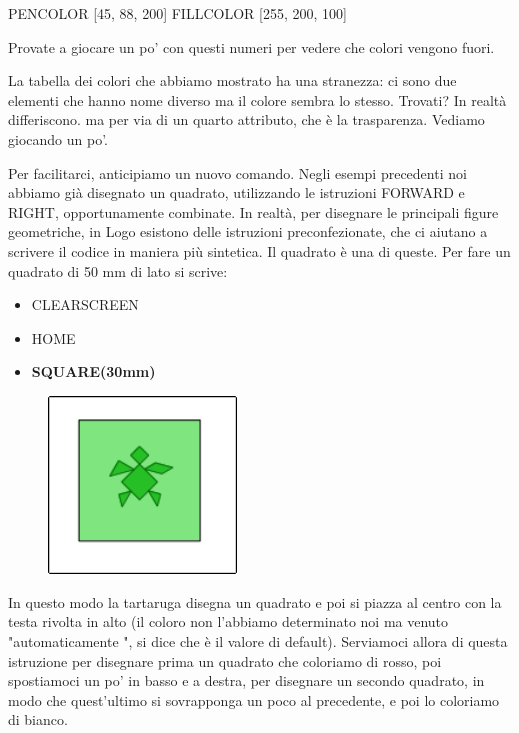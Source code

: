 PENCOLOR [45, 88, 200]
FILLCOLOR [255, 200, 100]

Provate a giocare un po' con questi numeri per vedere che colori vengono fuori.

La tabella dei colori che abbiamo mostrato ha una stranezza: ci sono due elementi che hanno nome diverso ma il colore sembra lo stesso. Trovati? In realtà differiscono. ma per via di un quarto attributo, che è la trasparenza. Vediamo giocando un po'. 

Per facilitarci, anticipiamo un nuovo comando. Negli esempi precedenti noi abbiamo già disegnato un quadrato, utilizzando le istruzioni FORWARD e RIGHT, opportunamente combinate. In realtà, per disegnare le principali figure geometriche, in Logo esistono delle istruzioni preconfezionate, che ci aiutano a scrivere il codice in maniera più sintetica. Il quadrato è una di queste. Per fare un quadrato di 50 mm di lato si scrive:

\vskip 1cm

\begin{scriptsize}
\begin{minipage}{0.40\textwidth}
\begin{itemize}[itemsep=-3pt,parsep=2pt]
\item[] CLEARSCREEN
\item[] HOME
\item[] \textbf{SQUARE(30mm)}                            
\end{itemize}
\end{minipage}
\end{scriptsize}
\begin{minipage}{0.4\textwidth}
\begin{figure}[H]
   \includegraphics[width=5.0cm,trim=4 4 8 4,clip]{./images/disegnare/disegnare-17.png}
   \label{dis-16-b}
\end{figure}
\end{minipage} \hfill

\vskip 1cm

In questo modo la tartaruga disegna un quadrato e poi si piazza al centro con la testa rivolta in alto (il coloro non l'abbiamo determinato noi ma venuto  "automaticamente ", si dice che è il valore di default). Serviamoci allora di questa istruzione per disegnare prima un quadrato che coloriamo di rosso, poi spostiamoci un po' in basso e a destra, per disegnare un secondo quadrato, in modo che quest'ultimo si sovrapponga un poco al precedente, e poi lo coloriamo di bianco.

